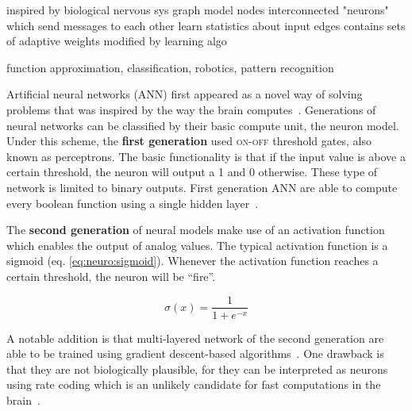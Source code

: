 inspired by biological nervous sys
graph model
nodes interconnected "neurons" which send messages to each other
learn statistics about input
edges contains sets of adaptive weights modified by learning algo

function approximation, classification, robotics, pattern recognition

Artificial neural networks (ANN) first appeared as a novel way of solving problems that was inspired by the way the brain computes~\cite{mcculloch1943logical}. Generations of neural networks can be classified by their basic compute unit, the neuron model. Under this scheme, the \textbf{first generation} used \textsc{on-off} threshold gates, also known as perceptrons. The basic functionality is that if the input value is above a certain threshold, the neuron will output a 1 and 0 otherwise. These type of network is limited to binary outputs. First generation ANN are able to compute every boolean function using a single hidden layer~\cite{third-gen-nn-Maass1997}.

The \textbf{second generation} of neural models make use of an activation function which enables the output of analog values. The typical activation function is a sigmoid (eq. \ref{eq:neuro:sigmoid}). Whenever the activation function reaches a certain threshold, the neuron will be ``fire''.

\begin{equation}
  \sigma(x) = \frac{1}{1 + e^{-x}}
  \label{eq:neuro:sigmoid}
\end{equation}

A notable addition is that multi-layered network of the second generation are able to be trained using gradient descent-based algorithms~\cite{hecht1989-backprop-theory}. One drawback is that they are not biologically plausible, for they can be interpreted as neurons using rate coding which is an unlikely candidate for fast computations in the brain~\cite{third-gen-nn-Maass1997}.

